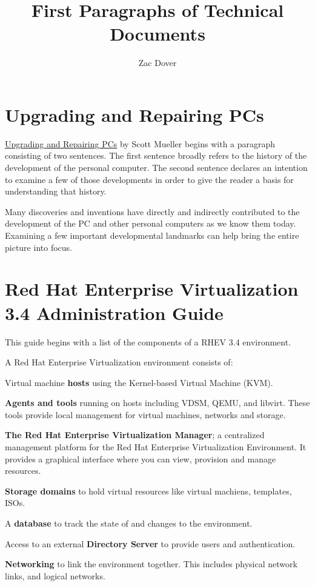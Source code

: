 \documentclass[a4paper,12pt]{article}
\title{First Paragraphs of Technical Documents}
\author{Zac Dover}
\begin{document}
\maketitle

\section{Upgrading and Repairing PCs}
\underline{Upgrading and Repairing PCs} by Scott Mueller begins with a paragraph consisting of two sentences. The first sentence broadly refers to the history of the development of the personal computer. The second sentence declares an intention to examine a few of those developments in order to give the reader a basis for understanding that history.
\begin{displayquote}
Many discoveries and inventions have directly and indirectly contributed to the development of the PC and other personal computers as we know them today. Examining a few important developmental landmarks can help bring the entire picture into focus.
\end{displayquote}

\section{Red Hat Enterprise Virtualization 3.4 Administration Guide}
This guide begins with a list of the components of a RHEV 3.4 environment.
\begin{displayquote}
{\tiny A Red Hat Enterprise Virtualization environment consists of:}
\begin{itemize}
{\tiny  \item Virtual machine \textbf{hosts} using the Kernel-based Virtual Machine (KVM).}
{\tiny  \item \textbf{Agents and tools} running on hosts including VDSM, QEMU, and libvirt. These tools provide local management for virtual machines, networks and storage.}
{\tiny  \item \textbf{The Red Hat Enterprise Virtualization Manager}; a centralized management platform for the Red Hat Enterprise Virtualization Environment. It provides a graphical interface where you can view, provision and manage resources.}
{\tiny  \item \textbf{Storage domains} to hold virtual resources like virtual machiens, templates, ISOs.}
{\tiny  \item A \textbf{database} to track the state of and changes to the environment.}
{\tiny  \item Access to an external \textbf{Directory Server} to provide users and authentication.}
{\tiny  \item \textbf{Networking} to link the environment together. This includes physical network links, and logical networks.}
\end{itemize}
\end{displayquote}
\end{document}
